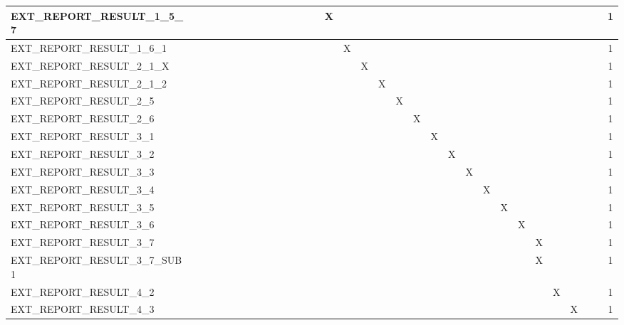 \documentclass{cslthse-msc}
\begin{document}
\begin{appendices}
\begin{table}[H]
{\begin{tabular}{  l | c | c | c | c | c | c | c | c | c | c | c | c | c | c | c | c | c | c | c | c | c | c | c | c | c | c | c | c | c | c | c | }
	EXT\_REPORT\_RESULT\_1\_5\_7 &  &  &  &  &  &  &  &  &  &  &  &  &  & X &  &  &  &  &  &  &  &  &  &  &  &  &  &  &  &  & 1 \\ \hline
	EXT\_REPORT\_RESULT\_1\_6\_1 &  &  &  &  &  &  &  &  &  &  &  &  &  &  & X &  &  &  &  &  &  &  &  &  &  &  &  &  &  &  & 1 \\ \hline
	EXT\_REPORT\_RESULT\_2\_1\_X &  &  &  &  &  &  &  &  &  &  &  &  &  &  &  & X &  &  &  &  &  &  &  &  &  &  &  &  &  &  & 1 \\ \hline
	EXT\_REPORT\_RESULT\_2\_1\_2 &  &  &  &  &  &  &  &  &  &  &  &  &  &  &  &  & X &  &  &  &  &  &  &  &  &  &  &  &  &  & 1 \\ \hline
	EXT\_REPORT\_RESULT\_2\_5 &  &  &  &  &  &  &  &  &  &  &  &  &  &  &  &  &  & X &  &  &  &  &  &  &  &  &  &  &  &  & 1 \\ \hline
	EXT\_REPORT\_RESULT\_2\_6 &  &  &  &  &  &  &  &  &  &  &  &  &  &  &  &  &  &  & X &  &  &  &  &  &  &  &  &  &  &  & 1 \\ \hline
	EXT\_REPORT\_RESULT\_3\_1 &  &  &  &  &  &  &  &  &  &  &  &  &  &  &  &  &  &  &  & X &  &  &  &  &  &  &  &  &  &  & 1 \\ \hline
	EXT\_REPORT\_RESULT\_3\_2 &  &  &  &  &  &  &  &  &  &  &  &  &  &  &  &  &  &  &  &  & X &  &  &  &  &  &  &  &  &  & 1 \\ \hline
	EXT\_REPORT\_RESULT\_3\_3 &  &  &  &  &  &  &  &  &  &  &  &  &  &  &  &  &  &  &  &  &  & X &  &  &  &  &  &  &  &  & 1 \\ \hline
	EXT\_REPORT\_RESULT\_3\_4 &  &  &  &  &  &  &  &  &  &  &  &  &  &  &  &  &  &  &  &  &  &  & X &  &  &  &  &  &  &  & 1 \\ \hline
	EXT\_REPORT\_RESULT\_3\_5 &  &  &  &  &  &  &  &  &  &  &  &  &  &  &  &  &  &  &  &  &  &  &  & X &  &  &  &  &  &  & 1 \\ \hline
	EXT\_REPORT\_RESULT\_3\_6 &  &  &  &  &  &  &  &  &  &  &  &  &  &  &  &  &  &  &  &  &  &  &  &  & X &  &  &  &  &  & 1 \\ \hline
	EXT\_REPORT\_RESULT\_3\_7 &  &  &  &  &  &  &  &  &  &  &  &  &  &  &  &  &  &  &  &  &  &  &  &  &  & X &  &  &  &  & 1 \\ \hline
	EXT\_REPORT\_RESULT\_3\_7\_SUB1 &  &  &  &  &  &  &  &  &  &  &  &  &  &  &  &  &  &  &  &  &  &  &  &  &  & X &  &  &  &  & 1 \\ \hline
	EXT\_REPORT\_RESULT\_4\_2 &  &  &  &  &  &  &  &  &  &  &  &  &  &  &  &  &  &  &  &  &  &  &  &  &  &  & X &  &  &  & 1 \\ \hline
	EXT\_REPORT\_RESULT\_4\_3 &  &  &  &  &  &  &  &  &  &  &  &  &  &  &  &  &  &  &  &  &  &  &  &  &  &  &  & X &  &  & 1 \\ \hline

\end{tabular}}
\end{table}
\end{appendices}
\end{document}
